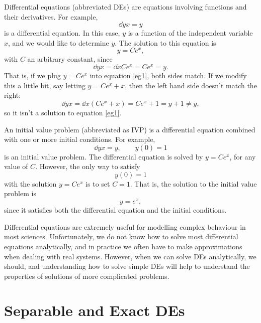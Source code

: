 \documentclass[10pt,driverfallback=hypertex]{report}
\begin{document}
Differential equations (abbreviated DEs) are equations involving functions and
their derivatives. For example,
\begin{dmath}
  \label{eg1}
  \dd{y}{x} =y
\end{dmath}
is a differential equation. In this case, $y$ is a function of the independent
variable $x$, and we would like to determine $y$. The solution to this
equation is
\begin{dmath*}
  y = Ce^x,
\end{dmath*}
with $C$ an arbitrary constant, since 
\begin{dmath*}\dd{y}{x}=\dd{}{x}Ce^x=Ce^x=y.\end{dmath*} 
That is, if we
plug $y=Ce^x$ into equation \eqref{eg1}, both sides match. If we modify this
a little bit, say letting $y=Ce^x +x$, then the left hand side doesn't
match the right:
\begin{dmath*}
  \dd{y}{x} = \dd{}{x}(Ce^x +x) 
  = Ce^x + 1 = y +1 
  \neq y,
\end{dmath*}
so it isn't a solution to equation \eqref{eg1}.

An initial value problem (abbreviated as IVP) is a differential equation
combined with one or more initial conditions. For example,
\begin{dmath*}[compact]
  \dd{y}{x}=y, \qquad y(0)=1
\end{dmath*}
is an initial value problem.
The differential equation is solved by $y=Ce^x$, for any value of $C$. However,
the only way to satisfy 
\begin{dmath*}
  y(0)=1
\end{dmath*}
with the solution $y=Ce^x$ is to set $C=1$. That is, the solution to
the initial value problem is 
\begin{dmath*}
  y=e^x,
\end{dmath*}
since it satisfies both the differential equation and the initial
conditions.

Differential equations are extremely useful for modelling complex behaviour in
most sciences. Unfortunately, we do not know how to solve most
differential equations analytically, and in practice we often have to
make approximations when dealing with real systems. However, when we can solve
DEs analytically, we should, and understanding how to solve simple DEs will
help to understand the properties of solutions of more complicated problems.



\chapter{Separable and Exact DEs}
\newpage
\end{document}
